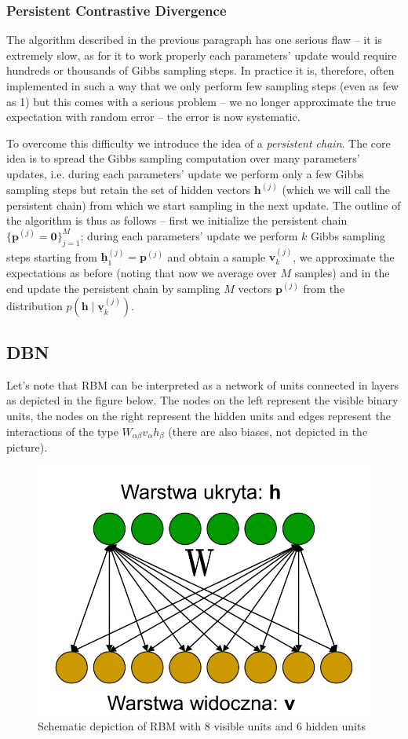 \documentclass{myclass}
\begin{document}
\subsubsection{Persistent Contrastive Divergence}

The algorithm described in the previous paragraph has one serious flaw -- it is extremely slow, as
for it to work properly each parameters' update would require hundreds or thousands of Gibbs
sampling steps. In practice it is, therefore, often implemented in such a way that we only perform
few sampling steps (even as few as 1) but this comes with a serious problem -- we no longer
approximate the true expectation with random error -- the error is now systematic.

To overcome this difficulty we introduce the idea of a \emph{persistent chain}. The core idea is to
spread the Gibbs sampling computation over many parameters' updates, i.e. during each parameters'
update we perform only a few Gibbs sampling steps but retain the set of hidden vectors
\(\bm{h}^{(j)}\) (which we will call the persistent chain) from which we start sampling in the next
update. The outline of the algorithm is thus as follows -- first we initialize the persistent chain
\(\{\bm{p}^{(j)} = \bm{0}\}_{j=1}^M\); during each parameters' update we perform \(k\) Gibbs
sampling steps starting from \(\underline{\bm{h}}_1^{(j)} = \bm{p}^{(j)}\) and obtain a sample
\(\bm{v}_k^{(j)}\), we approximate the expectations as before (noting that now we average over \(M\)
samples) and in the end update the persistent chain by sampling \(M\) vectors \(\bm{p}^{(j)}\) from
the distribution \(p(\bm{h} \mid \underline{\bm{v}}_k^{(j)})\).


\subsection{DBN}

Let's note that RBM can be interpreted as a network of units connected in layers as depicted in the
figure below. The nodes on the left represent the visible binary units, the nodes on the right
represent the hidden units and edges represent the interactions of the type \(W_{\alpha\beta}
v_\alpha h _\beta\) (there are also biases, not depicted in the picture).

\begin{figure}[ht]
   \centering
   \includegraphics[width=0.65\columnwidth]{figs/rbm.png}
   \caption{Schematic depiction of RBM with 8 visible units and 6 hidden units}
   \label{fig:rbm}
\end{figure}
\end{document}

